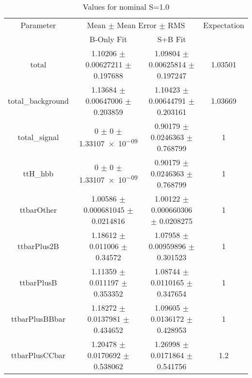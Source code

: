 \begin{table}
\centering
\caption{Values for nominal S=1.0}
\begin{tabular}{cccc}
\toprule
Parameter & \multicolumn{2}{c}{Mean $\pm$ Mean Error $\pm$ RMS} & Expectation\\
 & B-Only Fit & S+B Fit & \\
\midrule
total & \num{1.10206} $\pm$ \num{0.00627211} $\pm$ \num{0.197688} & \num{1.09804} $\pm$ \num{0.00625814} $\pm$ \num{0.197247} & \num{1.03501}\\
total\_background & \num{1.13684} $\pm$ \num{0.00647006} $\pm$ \num{0.203859} & \num{1.10423} $\pm$ \num{0.00644791} $\pm$ \num{0.203161} & \num{1.03669}\\
total\_signal & \num{0} $\pm$ \num{0} $\pm$ \num{1.33107e-09} & \num{0.90179} $\pm$ \num{0.0246363} $\pm$ \num{0.768799} & \num{1}\\
ttH\_hbb & \num{0} $\pm$ \num{0} $\pm$ \num{1.33107e-09} & \num{0.90179} $\pm$ \num{0.0246363} $\pm$ \num{0.768799} & \num{1}\\
ttbarOther & \num{1.00586} $\pm$ \num{0.000681045} $\pm$ \num{0.0214816} & \num{1.00122} $\pm$ \num{0.000660306} $\pm$ \num{0.0208275} & \num{1}\\
ttbarPlus2B & \num{1.18612} $\pm$ \num{0.011006} $\pm$ \num{0.34572} & \num{1.07958} $\pm$ \num{0.00959896} $\pm$ \num{0.301523} & \num{1}\\
ttbarPlusB & \num{1.11359} $\pm$ \num{0.011197} $\pm$ \num{0.353352} & \num{1.08744} $\pm$ \num{0.0110165} $\pm$ \num{0.347654} & \num{1}\\
ttbarPlusBBbar & \num{1.18272} $\pm$ \num{0.0137981} $\pm$ \num{0.434652} & \num{1.09605} $\pm$ \num{0.0136172} $\pm$ \num{0.428953} & \num{1}\\
ttbarPlusCCbar & \num{1.20478} $\pm$ \num{0.0170692} $\pm$ \num{0.538062} & \num{1.26998} $\pm$ \num{0.0171864} $\pm$ \num{0.541756} & \num{1.2}\\
\bottomrule
\end{tabular}
\end{table}